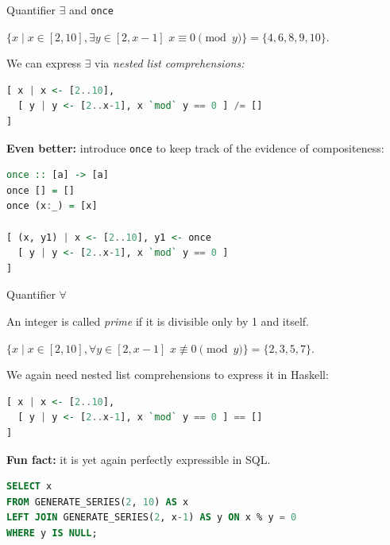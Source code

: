 \documentclass[handout]{beamer}
\begin{document}
\begin{frame}[fragile]{Quantifier $\exists$ and {\tt once}}

$ \{ x \mid x \in [2, 10], \exists y \in [2, x-1] \,\, x \equiv 0 \pmod y \} =
\{ 4,6,8,9,10 \}$.

\bigskip

We can express $\exists$ via {\em nested list comprehensions:}

\begin{lstlisting}[language=Haskell]
[ x | x <- [2..10],
  [ y | y <- [2..x-1], x `mod` y == 0 ] /= []
]
\end{lstlisting}

\pause

{\bf Even better:} introduce {\tt once} to keep track of the evidence of compositeness:

\begin{lstlisting}[language=Haskell]
once :: [a] -> [a]
once [] = []
once (x:_) = [x]

[ (x, y1) | x <- [2..10], y1 <- once
  [ y | y <- [2..x-1], x `mod` y == 0 ]
]
\end{lstlisting}


\end{frame}

\begin{frame}[fragile]{Quantifier $\forall$}

An integer is called {\em prime} if it is divisible only by 1 and itself.

\bigskip

$ \{ x \mid x \in [2, 10], \forall y \in [2, x-1] \,\, x \not\equiv 0 \pmod y \} =
\{ 2,3,5,7 \}$.

\bigskip

\pause

We again need nested list comprehensions to express it in Haskell:
\begin{lstlisting}[language=Haskell]
[ x | x <- [2..10],
  [ y | y <- [2..x-1], x `mod` y == 0 ] == []
]
\end{lstlisting}

\pause

{\bf Fun fact:} it is yet again perfectly expressible in SQL.
\begin{lstlisting}[language=SQL]
SELECT x
FROM GENERATE_SERIES(2, 10) AS x
LEFT JOIN GENERATE_SERIES(2, x-1) AS y ON x % y = 0
WHERE y IS NULL;
\end{lstlisting}

\end{frame}
\end{document}

